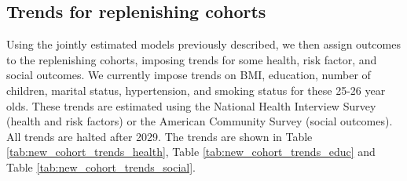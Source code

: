 \subsection{Trends for replenishing cohorts}
Using the jointly estimated models previously described, we then assign outcomes to the replenishing cohorts, imposing trends for some health, 
risk factor, and social outcomes.  We currently impose trends on BMI, education, number of children, marital status, hypertension, and smoking 
status for these 25-26 year olds.  These trends are estimated using the National Health Interview Survey (health and risk factors) or the American Community 
Survey (social outcomes). All trends are halted after 2029. The trends are shown in Table \ref{tab:new_cohort_trends_health}, Table \ref{tab:new_cohort_trends_educ} and 
Table \ref{tab:new_cohort_trends_social}.

